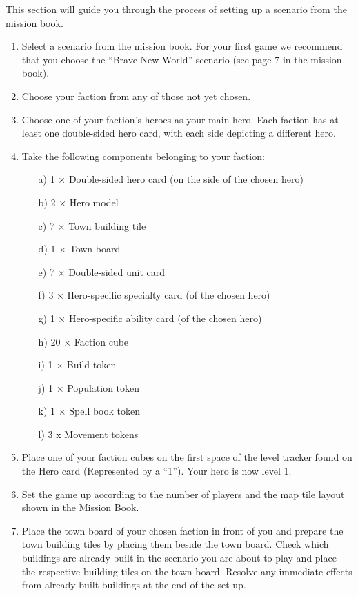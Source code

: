 This section will guide you through the process of setting up a scenario from the mission book.

\begin{enumerate}
  \item Select a scenario from the mission book. For your first game we recommend that you choose the “Brave New World” scenario (see page 7 in the mission book).
  \item Choose your faction from any of those not yet chosen.
  \item Choose one of your faction’s heroes as your main hero. Each faction has at least one double-sided hero card, with each side depicting a different hero.
  \item Take the following components belonging to your faction:
  \begin{itemize}
    \item[a)]1 × Double-sided hero card (on the side of the chosen hero)
    \item[b)]2 × Hero model
    \item[c)]7 × Town building tile
    \item[d)]1 × Town board
    \item[e)]7 × Double-sided unit card
    \item[f)]3 × Hero-specific specialty card (of the chosen hero)
    \item[g)]1 × Hero-specific ability card (of the chosen hero)
    \item[h)]20 × Faction cube
    \item[i)]1 × Build token
    \item[j)]1 × Population token
    \item[k)]1 × Spell book token
    \item[l)]3 x Movement tokens
  \end{itemize}
  \item Place one of your faction cubes on the first space of the level tracker found on the Hero card (Represented by a “1”). Your hero is now level 1.
  \item Set the game up according to the number of players and the map tile layout shown in the Mission Book.
  \item Place the town board of your chosen faction in front of you and prepare the town building tiles by placing them beside the town board. Check which buildings are already built in the scenario you are about to play and place the respective building tiles on the town board. Resolve any immediate effects from already built buildings at the end of the set up.

\end{enumerate}
